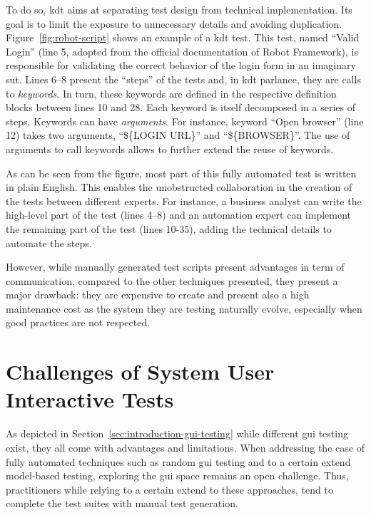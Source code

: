To do so, \gls{kdt} \cite{Tang2008, Hametner2012} aims at separating test design from technical implementation. Its goal is to limit the exposure to unnecessary details and avoiding duplication. Figure~\ref{fig:robot-script} shows an example of a \gls{kdt} test. This test, named ``Valid Login'' (line 5, adopted from the official documentation of Robot Framework), is responsible for validating the correct behavior of the login form in an imaginary \gls{sut}. Lines 6--8 present the ``steps'' of the tests and, in \gls{kdt} parlance, they are calls to \emph{keywords}. In turn, these keywords are defined in the respective definition blocks between lines 10 and 28. Each keyword is itself decomposed in a series of steps. Keywords can have \emph{arguments}. For instance, keyword ``Open browser'' (line 12) takes two arguments, ``\$\{LOGIN URL\}'' and ``\$\{BROWSER\}''. The use of arguments to call keywords allows to further extend the reuse of keywords.

As can be seen from the figure, most part of this fully automated test is written in plain English. This enables the unobstructed collaboration in the creation of the tests between different experts. For instance, a business analyst can write the high-level part of the test (lines 4--8) and an automation expert can implement the remaining part of the test (lines 10-35), adding the technical details to automate the steps.

However, while manually generated test scripts present advantages in term of communication, compared to the other techniques presented, they present a major drawback: they are expensive to create and present also a high maintenance cost as the system they are testing naturally evolve, especially when good practices are not respected.

\section{Challenges of System User Interactive Tests}

As depicted in Section~\ref{sec:introduction-gui-testing} while different \gls{gui} testing exist, they all come with advantages and limitations. When addressing the case of fully automated techniques such as random \gls{gui} testing and to a certain extend model-based testing, exploring the \gls{gui} space remains an open challenge. Thus, practitioners while relying to a certain extend to these approaches, tend to complete the test suites with manual test generation.

